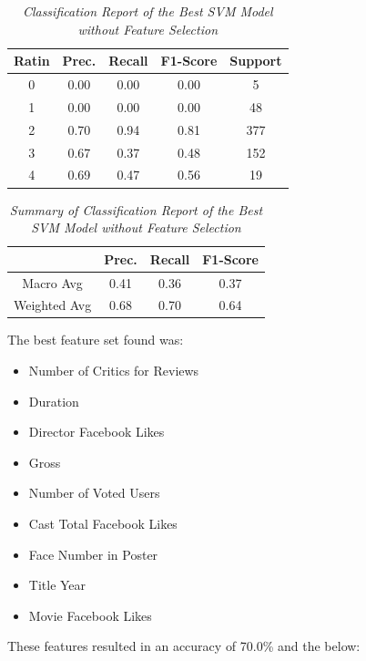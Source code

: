 \documentclass[11pt]{article}
\begin{document}
\begin{table}[!ht]
    \begin{center}
        \begin{tabular}{c|c|c|c|c}			
            \hline
            Ratin & Prec. & Recall & F1-Score & Support \\
            \hline\hline
            0 & 0.00 & 0.00 & 0.00 & 5 \\
            1 & 0.00 & 0.00 & 0.00 & 48 \\
            2 & 0.70 & 0.94 & 0.81 & 377 \\
            3 & 0.67 & 0.37 & 0.48 & 152 \\
            4 & 0.69 & 0.47 & 0.56 & 19\\
                \hline
        \end{tabular}

        \caption{\textit{Classification Report of the Best SVM Model without Feature Selection}}
        \label{svm-report}

    \end{center}
\end{table}
\begin{table}[!ht]
    \begin{center}
        \begin{tabular}{c||c|c|c}			
            \hline
             & Prec. & Recall & F1-Score \\
            \hline\hline
            Macro Avg & 0.41 & 0.36 & 0.37 \\
            Weighted Avg & 0.68 & 0.70 & 0.64 \\
                \hline
        \end{tabular}

        \caption{\textit{Summary of Classification Report of the Best SVM Model without Feature Selection}}
        \label{svm-report-sum}

    \end{center}
\end{table}
\noindent
The best feature set found was:
\begin{itemize}
    \item Number of Critics for Reviews
    \item Duration
    \item Director Facebook Likes
    \item Gross
    \item Number of Voted Users
    \item Cast Total Facebook Likes
    \item Face Number in Poster
    \item Title Year
    \item Movie Facebook Likes
\end{itemize}
\noindent
These features resulted in an accuracy of 70.0\% and the below:
\end{document}
